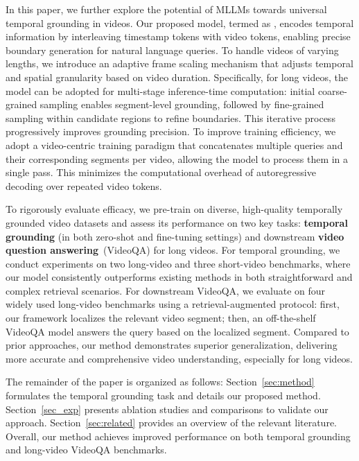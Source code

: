 In this paper, we further explore the potential of MLLMs towards universal temporal grounding in videos.
Our proposed model, termed as \textbf{\Model{}}, encodes temporal information by interleaving timestamp tokens with video tokens, 
enabling precise boundary generation for natural language queries.
To handle videos of varying lengths, we introduce an adaptive frame scaling mechanism that adjusts temporal and spatial granularity based on video duration. Specifically, for long videos, the model can be adopted for multi-stage inference-time computation: 
initial coarse-grained sampling enables segment-level grounding, followed by fine-grained sampling within candidate regions to refine boundaries. This iterative process progressively improves grounding precision. 
To improve training efficiency, we adopt a video-centric training paradigm that concatenates multiple queries and their corresponding segments per video, allowing the model to process them in a single pass. This minimizes the computational overhead of autoregressive decoding over repeated video tokens.

To rigorously evaluate efficacy, 
we pre-train \textbf{\Model{}} on diverse, high-quality temporally grounded video datasets and assess its performance on two key tasks: 
\textbf{temporal grounding} (in both zero-shot and fine-tuning settings) and downstream \textbf{video question answering}~(VideoQA) for long videos. 
For temporal grounding, we conduct experiments on two long-video and three short-video benchmarks, where our model consistently outperforms existing methods in both straightforward and complex retrieval scenarios. 
For downstream VideoQA, we evaluate on four widely used long-video benchmarks using a retrieval-augmented protocol: first, our framework localizes the relevant video segment; then, an off-the-shelf VideoQA model answers the query based on the localized segment. Compared to prior approaches, our method demonstrates superior generalization, delivering more accurate and comprehensive video understanding, especially for long videos.


The remainder of the paper is organized as follows: 
Section~\ref{sec:method} formulates the temporal grounding task and details our proposed method.
Section~\ref{sec_exp} presents ablation studies and comparisons to validate our approach. 
Section~\ref{sec:related} provides an overview of the relevant literature.
Overall, our method achieves improved performance on both temporal grounding and long-video VideoQA benchmarks.